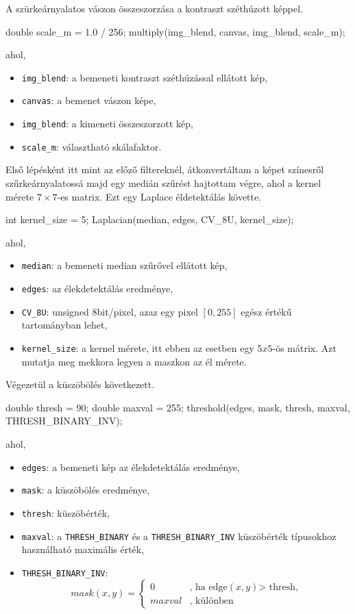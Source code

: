 A szürkeárnyalatos vászon összeszorzása a kontraszt széthúzott képpel.
\begin{cpp}
double scale_m = 1.0 / 256;
multiply(img_blend, canvas, img_blend, scale_m);
\end{cpp}
ahol,
\begin{itemize}
    \item \texttt{img\_blend}: a bemeneti kontraszt széthúzással ellátott kép,
    \item \texttt{canvas}: a bemenet vászon képe,
    \item \texttt{img\_blend}: a kimeneti összeszorzott kép,
    \item \texttt{scale\_m}: választható skálafaktor.
\end{itemize}


Első lépésként itt mint az előző filtereknél, átkonvertáltam a képet színesről szűrkeárnyalatossá majd egy medián szűrést hajtottam végre, ahol a kernel mérete $7 \times 7$-es matrix.
Ezt egy Laplace éldetektálás követte.
\begin{cpp}
int kernel_size = 5;  
Laplacian(median, edges, CV_8U, kernel_size);
\end{cpp}
ahol,
\begin{itemize}
    \item \texttt{median}: a bemeneti median szűrővel ellátott kép,
    \item \texttt{edges}: az élekdetektálás eredménye,
    \item \texttt{CV\_8U}: unsigned 8bit/pixel, azaz egy pixel $[0, 255]$ egész értékű tartományban lehet,
    \item \texttt{kernel\_size}: a kernel mérete, itt ebben az esetben egy $5 x 5$-ös mátrix. Azt mutatja meg mekkora legyen a maszkon az él mérete.
\end{itemize}
Végezetül a küszöbölés következett.
\begin{cpp}
double thresh = 90;
double maxval = 255;
threshold(edges, mask, thresh, maxval, THRESH_BINARY_INV);
\end{cpp}
ahol,
\begin{itemize}
    \item \texttt{edges}: a bemeneti kép az élekdetektálás eredménye,
    \item \texttt{mask}: a küszöbölés eredménye,
    \item \texttt{thresh}: küszöbérték,
    \item \texttt{maxval}: a \texttt{THRESH\_BINARY} és a \texttt{THRESH\_BINARY\_INV} küszöbérték típusokhoz használható maximális érték,
    \item \texttt{THRESH\_BINARY\_INV}:
$$
mask(x, y) = \left\{
\begin{array}{ll}
0 & \mbox{, ha edge$(x, y)$> thresh,}\\
maxval & \mbox{, különben}
\end{array}
\right.
$$
\end{itemize}

